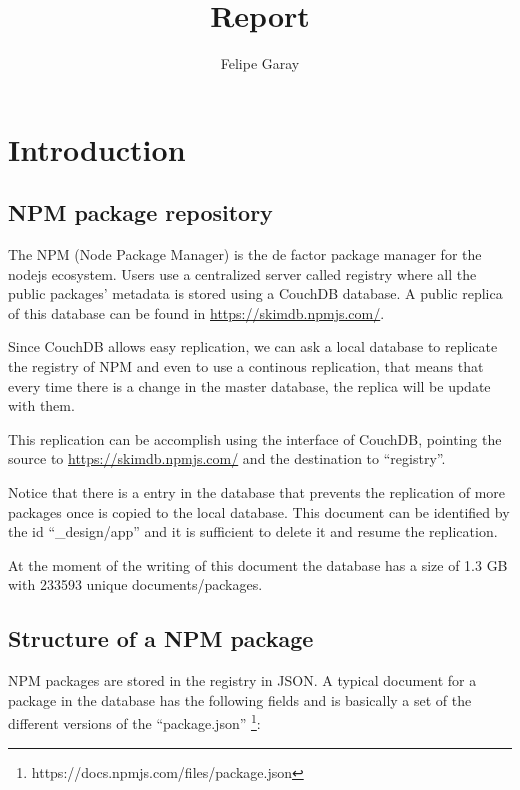 \documentclass[letterpaper,12pt]{report}
\title{Report}
\author{Felipe Garay}
\begin{document}
\maketitle
\newpage
\tableofcontents
\newpage


\chapter{Introduction}

\section{NPM package repository}

The NPM (Node Package Manager) is the de factor package manager for the nodejs
ecosystem. Users use a centralized server called registry where all the public
packages' metadata is stored using a CouchDB database. A public replica of this
database can be found in \url{https://skimdb.npmjs.com/}.

Since CouchDB allows easy replication, we can ask a local database to replicate
the registry of NPM and even to use a continous replication, that means that
every time there is a change in the master database, the replica will be update
with them.

This replication can be accomplish using the interface of CouchDB, pointing the
source to \url{https://skimdb.npmjs.com/} and the destination to ``registry''.

Notice that there is a entry in the database that prevents the replication of
more packages once is copied to the local database. This document can be
identified by the id ``\_design/app'' and it is sufficient to delete it and
resume the replication.

At the moment of the writing of this document the database has a size of 1.3 GB
with 233593	unique documents/packages.

\section{Structure of a NPM package}


NPM packages are stored in the registry in JSON. A typical document for a
package in the database has the following fields and is basically a set of the
different versions of the ``package.json''
\footnote{https://docs.npmjs.com/files/package.json}:
\end{document}
